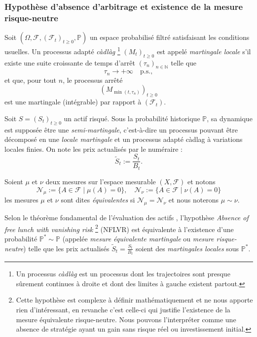 \subsubsection{Hypothèse d'absence d'arbitrage et existence de la mesure risque-neutre}

\begin{definition}
Soit $(\Omega,\mathcal F,(\mathcal F_t)_{t \ge 0},\mathbb P)$ un espace probabilisé filtré satisfaisant les
conditions usuelles. Un processus adapté \emph{càdlàg} \footnote{Un processus \emph{càdlàg} est un processus
dont les trajectoires sont presque sûrement continues à droite et dont des limites à gauche existent partout.}
$(M_t)_{t \ge 0}$ est appelé \emph{martingale locale} s'il existe une suite croissante de temps d'arrêt
$(\tau_n)_{n \in \mathbb N}$ telle que
\[
\tau_n \to +\infty \quad \text{p.s.},
\]
et que, pour tout $n$, le processus arrêté
\[
(M_{\min(t, \tau_n)})_{t \ge 0}
\]
est une martingale (intégrable) par rapport à $(\mathcal F_t)$.
\end{definition}

Soit $S=(S_t)_{t \ge 0}$ un actif risqué. Sous la probabilité historique $\mathbb{P}$, sa dynamique est
supposée être une \emph{semi-martingale}, c'est-à-dire un processus pouvant être décomposé
en une \emph{locale martingale} et un processus adapté càdlag à variations locales finies.
\noindent On note les prix actualisés par le numéraire :
\begin{equation}
    \tilde S_t := \frac{S_t}{B_t}.
\end{equation}

\begin{definition}
    Soient $\mu$ et $\nu$ deux mesures sur l'espace mesurable $(X,\mathcal{F})$ et notons
    \[
        \mathcal{N}_\mu := \{ A \in \mathcal{F} \mid \mu(A) = 0 \}, 
        \quad \mathcal{N}_\nu := \{ A \in \mathcal{F} \mid \nu(A) = 0 \}
    \]
    les mesures $\mu$ et $\nu$ sont dites \emph{équivalentes} si $\mathcal{N}_\mu = \mathcal{N}_\nu$
    et nous noterons $\mu \sim \nu$.
\end{definition}

Selon le théorème fondamental de l'évaluation des actifs \cite{DelbaenSchachermayer},
l'hypothèse \emph{Absence of free lunch with vanishing risk} \footnote{Cette hypothèse est complexe à définir
mathématiquement et ne nous apporte rien d'intéressant, en revanche c'est celle-ci qui justifie l'existence
de la mesure équivalente risque-neutre. Nous pouvons l'interpréter comme une absence de stratégie ayant un gain
sans risque réel ou investissement initial.} (NFLVR) est équivalente à l'existence d'une probabilité
$\mathbb{P}^* \sim \mathbb{P}$ (appelée \emph{mesure équivalente martingale} ou \emph{mesure risque-neutre})
telle que les prix actualisés $\tilde S_t = \frac{S_t}{B_t}$ soient des \emph{martingales locales} sous
$\mathbb{P}^*$.


